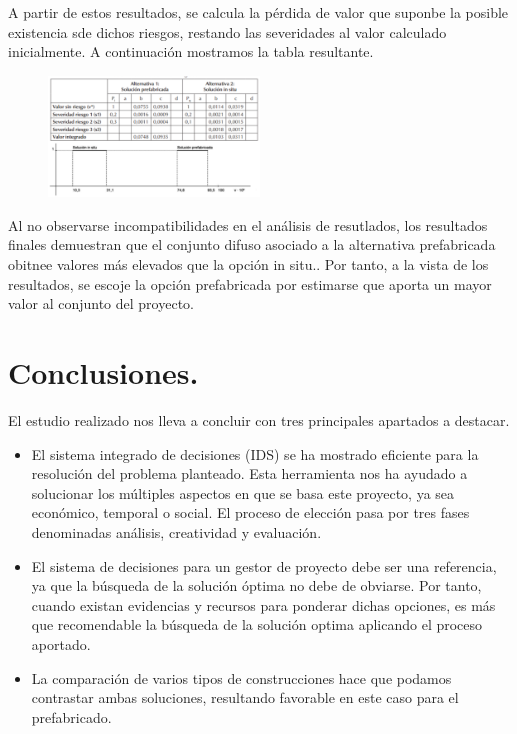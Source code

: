\documentclass[10pt]{article}
\begin{document}
A partir de estos resultados, se calcula la pérdida de valor que suponbe la posible existencia sde dichos riesgos, restando las severidades al valor calculado inicialmente. A continuación mostramos la tabla resultante.

\begin{figure}[H]
	\begin{center}
 		\includegraphics[width = 0.5\textwidth]{Imagenes/img10.eps}
	\end{center} 
\end{figure}

Al no observarse incompatibilidades en el análisis de resutlados, los resultados finales demuestran que el conjunto difuso asociado a la alternativa prefabricada obitnee valores más elevados que la opción in situ.. Por tanto, a la vista de los resultados, se escoje la opción prefabricada por estimarse que aporta un mayor valor al conjunto del proyecto.

\section{Conclusiones.}

El estudio realizado nos lleva a concluir con tres principales apartados a destacar.

\begin{itemize}

	\item El sistema integrado de decisiones (IDS) se ha mostrado eficiente para la resolución del problema planteado. Esta herramienta nos ha ayudado a solucionar los múltiples aspectos en  que se basa este proyecto, ya sea económico, temporal o social. El proceso de elección pasa por tres fases denominadas análisis, creatividad y evaluación.
	
	\item El sistema de decisiones para un gestor de proyecto debe ser una referencia, ya que la búsqueda de la solución óptima no debe de obviarse. Por tanto, cuando existan evidencias y recursos para ponderar dichas opciones, es más que recomendable la búsqueda de la solución optima aplicando el proceso aportado.
	
	\item La comparación de varios tipos de construcciones hace que podamos contrastar ambas soluciones, resultando favorable en este caso para el prefabricado.

\end{itemize}
\end{document}
